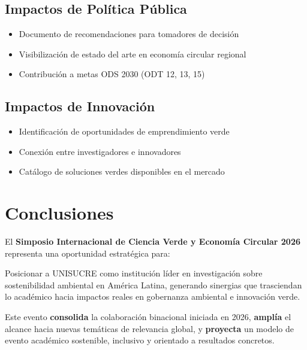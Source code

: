 \documentclass[12pt,a4paper]{article}
\begin{document}
\subsection{Impactos de Política Pública}

\begin{itemize}[label={\textcolor{verdeosc}{\textbullet}}]
  \item Documento de recomendaciones para tomadores de decisión
  \item Visibilización de estado del arte en economía circular regional
  \item Contribución a metas ODS 2030 (ODT 12, 13, 15)
\end{itemize}

\subsection{Impactos de Innovación}

\begin{itemize}[label={\textcolor{verdeosc}{\textbullet}}]
  \item Identificación de oportunidades de emprendimiento verde
  \item Conexión entre investigadores e innovadores
  \item Catálogo de soluciones verdes disponibles en el mercado
\end{itemize}

\section{Conclusiones}

El \textbf{Simposio Internacional de Ciencia Verde y Economía Circular 2026} representa una oportunidad estratégica para:

\begin{tcolorbox}[cajainfo, title=Propuesta integral]
Posicionar a UNISUCRE como institución líder en investigación sobre sostenibilidad ambiental en América Latina, generando sinergias que trasciendan lo académico hacia impactos reales en gobernanza ambiental e innovación verde.
\end{tcolorbox}

Este evento \textbf{consolida} la colaboración binacional iniciada en 2026, \textbf{amplía} el alcance hacia nuevas temáticas de relevancia global, y \textbf{proyecta} un modelo de evento académico sostenible, inclusivo y orientado a resultados concretos.
\end{document}
